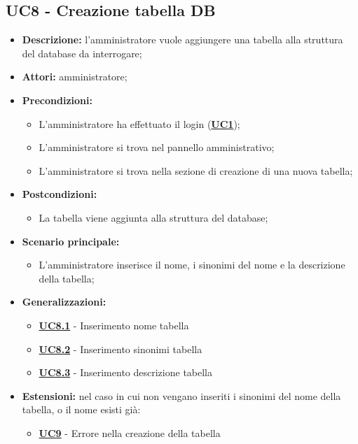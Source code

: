 \subsection{UC8 - Creazione tabella DB}
\label{sec:UC8}
\begin{itemize}
	\item \textbf{Descrizione:} l’amministratore vuole aggiungere una tabella alla struttura del database da interrogare;
	\item \textbf{Attori:} amministratore;
	\item \textbf{Precondizioni:} 
	\begin{itemize}
		\item L’amministratore ha effettuato il login (\hyperref[sec:UC1]{\textbf{UC1}});
		\item L’amministratore si trova nel pannello amministrativo;
		\item L’amministratore si trova nella sezione di creazione di una nuova tabella;
	\end{itemize}
	\item \textbf{Postcondizioni:} 
	\begin{itemize}
		\item La tabella viene aggiunta alla struttura del database;
	\end{itemize}
	\item \textbf{Scenario principale:} 
	\begin{itemize}
		\item L’amministratore inserisce il nome, i sinonimi del nome e la descrizione della tabella;
	\end{itemize}
	\item \textbf{Generalizzazioni:} 
	\begin{itemize}
		\item \hyperref[sec:UC8.1]{\textbf{UC8.1}} - Inserimento nome tabella
		\item \hyperref[sec:UC8.2]{\textbf{UC8.2}} - Inserimento sinonimi tabella
		\item \hyperref[sec:UC8.3]{\textbf{UC8.3}} - Inserimento descrizione tabella
	\end{itemize}
	\item \textbf{Estensioni:} nel caso in cui non vengano inseriti i sinonimi del nome della tabella, o il nome esisti già:
	\begin{itemize}
		\item \hyperref[sec:UC9]{\textbf{UC9}} - Errore nella creazione della tabella
	\end{itemize}
\end{itemize}

